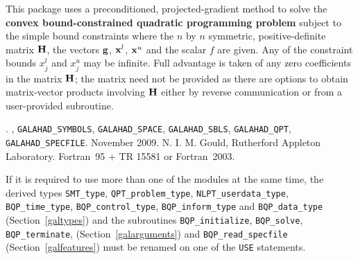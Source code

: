 \documentclass{galahad}
\newcommand{\packagename}{BQP}
\newcommand{\fullpackagename}{\libraryname\_\packagename}
\begin{document}
\galheader


\galsummary
This package uses a preconditioned, projected-gradient method
to solve the {\bf convex bound-constrained quadratic programming problem}
subject to the simple bound constraints
where the $n$ by $n$ symmetric, positive-definite matrix ${\mathbf{H}}$, the 
vectors ${\mathbf{g}}$, ${\mathbf{x}}^{l}$, ${\mathbf{x}}^{u}$ and the scalar $f$ are given.
Any of the constraint bounds $x_{j}^{l}$ and $x_{j}^{u}$ may be infinite.
Full advantage is taken of any zero coefficients in the matrix ${\mathbf{H}}$;
the matrix need not be provided as there are options to obtain matrix-vector
products involving ${\mathbf{H}}$ either by reverse communication or from a 
user-provided subroutine.


\galattributes
\galversions{\tt  \fullpackagename\_single, \fullpackagename\_double}.
,
{\tt GALAHAD\_SY\-M\-BOLS}, 
{\tt GALAHAD\-\_\-SPACE}, 
{\tt GALAHAD\_SBLS},
{\tt GALAHAD\_QPT},
{\tt GALAHAD\_SPECFILE}.
\galdate November 2009.
\galorigin N. I. M. Gould, Rutherford Appleton Laboratory.
\gallanguage Fortran~95 + TR 15581 or Fortran~2003. 


\galhowto




\noindent
If it is required to use more than one of the modules at the same time, 
the derived types
{\tt SMT\_type}, 
{\tt QPT\_problem\_type}, 
{\tt NLPT\_userdata\-\_type},
{\tt \packagename\_time\_type}, 
{\tt \packagename\_control\_type}, 
{\tt \packagename\_inform\_type} 
and
{\tt \packagename\_data\_type}
(Section~\ref{galtypes})
and the subroutines
{\tt \packagename\_initialize}, 
{\tt \packagename\_\-solve},
{\tt \packagename\_terminate},
(Section~\ref{galarguments})
and 
{\tt \packagename\_read\_specfile}
(Section~\ref{galfeatures})
must be renamed on one of the {\tt USE} statements.

\end{document}
